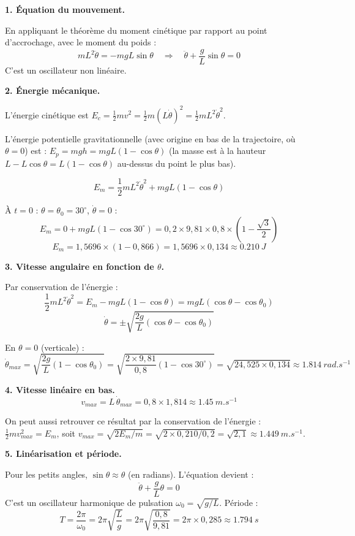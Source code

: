 \documentclass[12pt,a4paper]{article}
\begin{document}
\begin{boitecorrige}
\textbf{1. Équation du mouvement.}

En appliquant le théorème du moment cinétique par rapport au point d'accrochage, avec le moment du poids :
\[
mL^2\ddot{\theta} = -mgL\sin\theta \quad \Rightarrow \quad \ddot{\theta} + \frac{g}{L}\sin\theta = 0
\]
C'est un oscillateur non linéaire.

\textbf{2. Énergie mécanique.}

L'énergie cinétique est $E_c = \frac{1}{2}mv^2 = \frac{1}{2}m(L\dot\theta)^2 = \frac{1}{2}mL^2\dot\theta^2$.

L'énergie potentielle gravitationnelle (avec origine en bas de la trajectoire, où $\theta = 0$) est :
$E_p = mgh = mgL(1 - \cos\theta)$ (la masse est à la hauteur $L - L\cos\theta = L(1-\cos\theta)$ au-dessus du point le plus bas).

\[
E_m = \frac{1}{2}mL^2\dot{\theta}^2 + mgL(1-\cos\theta)
\]

À $t = 0$ : $\theta = \theta_0 = 30^\circ $, $\dot{\theta} = 0$ :
\[
E_m = 0 + mgL(1-\cos 30^\circ ) = 0{,}2\times9{,}81\times0{,}8\times(1 - \frac{\sqrt{3}}{2})
\]
\[
E_m = 1{,}5696\times(1 - 0{,}866) = 1{,}5696\times0{,}134 \approx \qty{0.210}{J}
\]

\textbf{3. Vitesse angulaire en fonction de $\theta$.}

Par conservation de l'énergie :
\[
\frac{1}{2}mL^2\dot\theta^2 = E_m - mgL(1-\cos\theta) = mgL(\cos\theta - \cos\theta_0)
\]
\[
\boxed{\dot\theta = \pm\sqrt{\frac{2g}{L}(\cos\theta - \cos\theta_0)}}
\]

En $\theta = 0$ (verticale) :
\[
\dot\theta_{max} = \sqrt{\frac{2g}{L}(1 - \cos\theta_0)} = \sqrt{\frac{2\times9{,}81}{0{,}8}(1-\cos 30^\circ )} = \sqrt{24{,}525\times0{,}134} \approx \qty{1.814}{rad.s^{-1}}
\]

\textbf{4. Vitesse linéaire en bas.}
\[
v_{max} = L\,\dot\theta_{max} = 0{,}8\times1{,}814 \approx \qty{1.45}{m.s^{-1}}
\]

On peut aussi retrouver ce résultat par la conservation de l'énergie : $\frac{1}{2}mv_{max}^2 = E_m$, soit $v_{max} = \sqrt{2E_m/m} = \sqrt{2\times0{,}210/0{,}2} = \sqrt{2{,}1} \approx \qty{1.449}{m.s^{-1}}$.

\textbf{5. Linéarisation et période.}

Pour les petits angles, $\sin\theta \approx \theta$ (en radians). L'équation devient :
\[
\ddot{\theta} + \frac{g}{L}\theta = 0
\]
C'est un oscillateur harmonique de pulsation $\omega_0 = \sqrt{g/L}$. Période :
\[
T = \frac{2\pi}{\omega_0} = 2\pi\sqrt{\frac{L}{g}} = 2\pi\sqrt{\frac{0{,}8}{9{,}81}} = 2\pi\times0{,}285 \approx \qty{1.794}{s}
\]


\end{boitecorrige}
\end{document}
